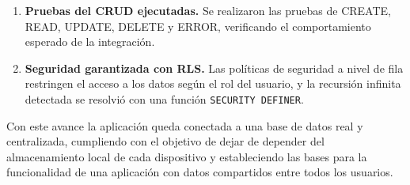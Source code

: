 \begin{enumerate}
  \item \textbf{Pruebas del CRUD ejecutadas.} Se realizaron las pruebas de
    CREATE, READ, UPDATE, DELETE y ERROR, verificando el comportamiento
    esperado de la integraci\'on.

  \item \textbf{Seguridad garantizada con RLS.} Las pol\'iticas de
    seguridad a nivel de fila restringen el acceso a los datos seg\'un el
    rol del usuario, y la recursi\'on infinita detectada se resolvi\'o con
    una funci\'on \texttt{SECURITY DEFINER}.
\end{enumerate}

Con este avance la aplicaci\'on queda conectada a una base de datos
real y centralizada, cumpliendo con el objetivo de dejar de depender del
almacenamiento local de cada dispositivo y estableciendo las bases para
la funcionalidad de una aplicaci\'on con datos compartidos entre todos
los usuarios.